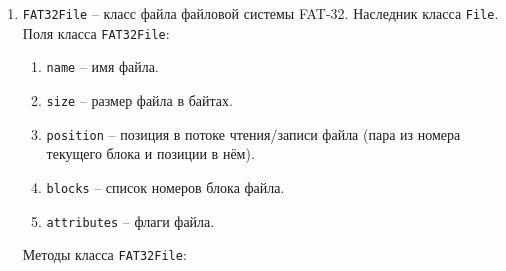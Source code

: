 \begin{enumerate}
\begin{enumerate}
		\begin{enumerate}
		\item \texttt{name} -- название файла.
		\item \texttt{size} -- размер файла в байтах. Для каталогов равно 0.
		\item \texttt{create-date} -- дата создания файла.
		\item \texttt{create-time} -- время создания файла.
		\item \texttt{modify-date} -- дата последнего изменения файла.
		\item \texttt{modify-time} -- время последнего изменения файла.
		\item \texttt{access-date} -- дата последнего доступа файла.
		\item \texttt{access-date} -- всегда имеет значение равное \texttt{nil}.
		\item \texttt{isdir} -- флаг, показывающий, является ли файл каталогом.
		\item \texttt{create-time-ms} -- сотые доли секунды создания файла или каталога (1 байт). Имеет значение от 0 до 199 (от 0 до 1.99 секунды с шагом 0.01 секунда).
		\item \texttt{attribute} -- атрибуты файла.
		\end{enumerate}
		
	\item \texttt{new-block} -- добавить новый блок к файлу. Аргументы: \texttt{file-object}(объект файла, к которому необходимо добавить новый блок). Возвращает \texttt{nil}.
		
	\end{enumerate}

\item \texttt{FAT32File} -- класс файла файловой системы FAT-32. Наследник класса \texttt{File}. Поля класса \texttt{FAT32File}:

	\begin{enumerate}
	\item \texttt{name} -- имя файла.
	\item \texttt{size} -- размер файла в байтах.
	\item \texttt{position} -- позиция в потоке чтения/записи файла (пара из номера текущего блока и позиции в нём).
	\item \texttt{blocks} -- список номеров блока файла.
	\item \texttt{attributes} -- флаги файла.
	\end{enumerate}
	
Методы класса \texttt{FAT32File}:


\end{enumerate}
